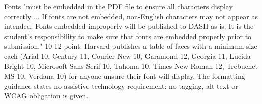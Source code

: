 %




	{Fonts "must be embedded in the PDF file to ensure all characters display
	 correctly ... If fonts are not embedded, non-English characters may not
	 appear as intended. Fonts embedded improperly will be published to DASH as
	 is. It is the student's responsibility to make sure that fonts are embedded
	 properly prior to submission."}
	{10-12 point. Harvard publishes a table of faces with a minimum size each
	 (Arial 10, Century 11, Courier New 10, Garamond 12, Georgia 11, Lucida
	 Bright 10, Microsoft Sans Serif 10, Tahoma 10, Times New Roman 12,
	 Trebuchet MS 10, Verdana 10) for anyone unsure their font will display.}
	{The formatting guidance states no assistive-technology requirement: no
	 tagging, alt-text or WCAG obligation is given.}
